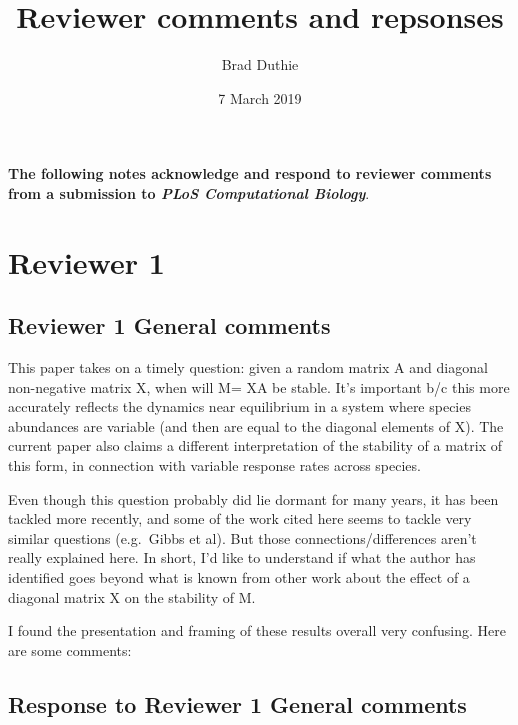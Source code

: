 \documentclass[]{article}
\title{Reviewer comments and repsonses}
\author{Brad Duthie}
\date{7 March 2019}
\begin{document}
\maketitle

\textbf{The following notes acknowledge and respond to reviewer comments
from a submission to \emph{PLoS Computational Biology}}.

\section{Reviewer 1}\label{reviewer-1}

\subsection{Reviewer 1 General
comments}\label{reviewer-1-general-comments}

This paper takes on a timely question: given a random matrix A and
diagonal non-negative matrix X, when will M= XA be stable. It's
important b/c this more accurately reflects the dynamics near
equilibrium in a system where species abundances are variable (and then
are equal to the diagonal elements of X). The current paper also claims
a different interpretation of the stability of a matrix of this form, in
connection with variable response rates across species.

Even though this question probably did lie dormant for many years, it
has been tackled more recently, and some of the work cited here seems to
tackle very similar questions (e.g.~Gibbs et al). But those
connections/differences aren't really explained here. In short, I'd like
to understand if what the author has identified goes beyond what is
known from other work about the effect of a diagonal matrix X on the
stability of M.

I found the presentation and framing of these results overall very
confusing. Here are some comments:

\subsection{Response to Reviewer 1 General
comments}\label{response-to-reviewer-1-general-comments}
\end{document}
